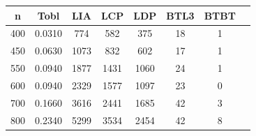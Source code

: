 \documentclass[10pt,a4paper]{article}
\begin{document}
\begin{center}
    \begin{tabular}{ |c|c|c|c|c|c|c|c| }
        \hline
        n & Tobl & LIA & LCP & LDP & BTL3 & BTBT \\
        \hline
        400	& 0.0310 & 774 & 582 & 375 & 18 & 1\\
        \hline
        450	& 0.0630 & 1073 & 832 &	602 & 17 & 1\\
        \hline
        550	& 0.0940 & 1877 & 1431 & 1060 & 24 & 1\\
        \hline
        600	& 0.0940 & 2329 & 1577 & 1097 &	23 & 0\\
        \hline
        700	 & 0.1660 &	3616 & 2441 & 1685 & 42 & 3\\
        \hline
        800	& 0.2340 & 5299 & 3534 & 2454 &	42 & 8\\
        \hline
    \end{tabular}
\end{center}
\end{document}
